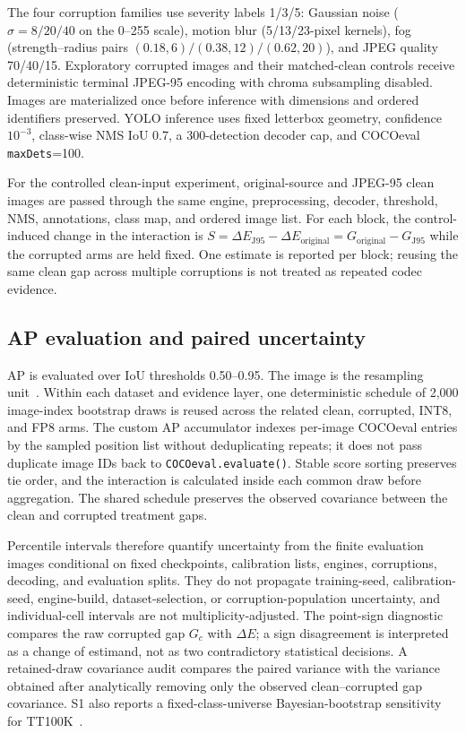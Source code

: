 \documentclass[a4paper,fleqn]{cas-dc}
\begin{document}
The four corruption families use severity labels 1/3/5: Gaussian noise ($\sigma=8/20/40$ on the 0--255 scale), motion blur (5/13/23-pixel kernels), fog (strength--radius pairs $(0.18,6)/(0.38,12)/(0.62,20)$), and JPEG quality 70/40/15. Exploratory corrupted images and their matched-clean controls receive deterministic terminal JPEG-95 encoding with chroma subsampling disabled. Images are materialized once before inference with dimensions and ordered identifiers preserved. YOLO inference uses fixed letterbox geometry, confidence $10^{-3}$, class-wise NMS IoU 0.7, a 300-detection decoder cap, and COCOeval \texttt{maxDets}=100.

For the controlled clean-input experiment, original-source and JPEG-95 clean images are passed through the same engine, preprocessing, decoder, threshold, NMS, annotations, class map, and ordered image list. For each block, the control-induced change in the interaction is $S=\Delta E_{\mathrm{J95}}-\Delta E_{\mathrm{original}}=G_{\mathrm{original}}-G_{\mathrm{J95}}$ while the corrupted arms are held fixed. One estimate is reported per block; reusing the same clean gap across multiple corruptions is not treated as repeated codec evidence.

\subsection{AP evaluation and paired uncertainty}
\label{sec:uncertainty}

AP is evaluated over IoU thresholds 0.50--0.95. The image is the resampling unit~\citep{efron1979bootstrap}. Within each dataset and evidence layer, one deterministic schedule of 2,000 image-index bootstrap draws is reused across the related clean, corrupted, INT8, and FP8 arms. The custom AP accumulator indexes per-image COCOeval entries by the sampled position list without deduplicating repeats; it does not pass duplicate image IDs back to \texttt{COCOeval.evaluate()}. Stable score sorting preserves tie order, and the interaction is calculated inside each common draw before aggregation. The shared schedule preserves the observed covariance between the clean and corrupted treatment gaps.

Percentile intervals therefore quantify uncertainty from the finite evaluation images conditional on fixed checkpoints, calibration lists, engines, corruptions, decoding, and evaluation splits. They do not propagate training-seed, calibration-seed, engine-build, dataset-selection, or corruption-population uncertainty, and individual-cell intervals are not multiplicity-adjusted. The point-sign diagnostic compares the raw corrupted gap $G_c$ with $\Delta E$; a sign disagreement is interpreted as a change of estimand, not as two contradictory statistical decisions. A retained-draw covariance audit compares the paired variance with the variance obtained after analytically removing only the observed clean--corrupted gap covariance. S1 also reports a fixed-class-universe Bayesian-bootstrap sensitivity for TT100K~\citep{rubin1981bayesian}.
\end{document}
